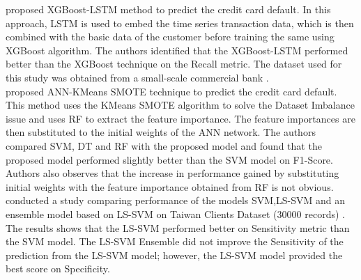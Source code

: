 \documentclass[twoside,11pt,a4paper]{article}
\begin{document}
\citep{gao2021research} proposed \acs{XGBoost}-\acs{LSTM} method to predict the credit card default. In this approach, \acs{LSTM} is used to embed the time series transaction data, which is then combined with the basic data of the customer before training the same using \acs{XGBoost} algorithm. The authors identified that the \acs{XGBoost}-\acs{LSTM} performed better than the \acs{XGBoost} technique on the Recall metric. The dataset used for this study was obtained from a small-scale commercial bank \citep{gao2021research}.\\

\cite{chen2021research} proposed \acs{ANN}-KMeans \acs{SMOTE} technique to predict the credit card default. This method uses the KMeans \acs{SMOTE} algorithm to solve the Dataset Imbalance issue and uses \acs{RF} to extract the feature importance. The feature importances are then substituted to the initial weights of the \acs{ANN} network. The authors compared \acs{SVM}, \acs{DT} and \acs{RF} with the proposed model and found that the proposed model performed slightly better than the \acs{SVM} model on F1-Score. Authors also observes that the increase in performance gained by substituting initial weights with the feature importance obtained from \acs{RF} is not obvious.\\

\citep{lawi2018classification} conducted a study comparing performance of the models \acs{SVM},\acf{LS-SVM} \citep{suykens1999least}  and an ensemble model based on \acs{LS-SVM}  on Taiwan Clients Dataset (30000 records) \citep{yeh2009comparisons}. The results shows that the \acs{LS-SVM} performed better on Sensitivity metric than the \acs{SVM} model. The \acs{LS-SVM} Ensemble did not improve the Sensitivity of the prediction from the \acs{LS-SVM} model; however, the \acs{LS-SVM} model provided the best score on Specificity. \\
\end{document}
